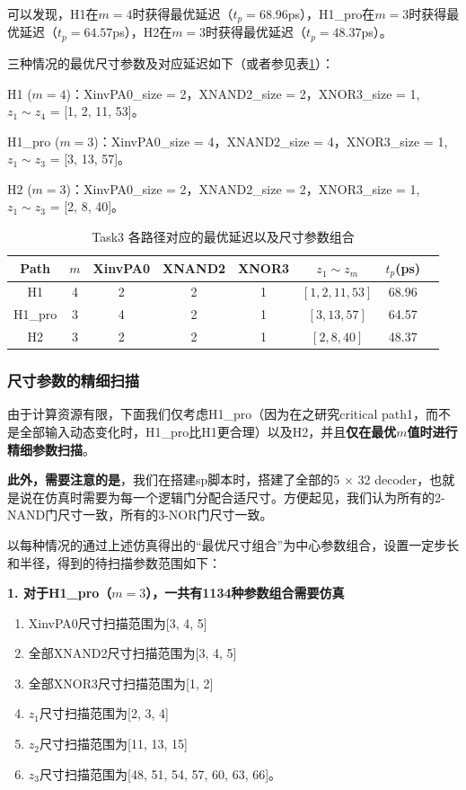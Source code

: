 \documentclass[UTF8,12pt,a4paper]{ctexart}
\begin{document}
可以发现，H1在$m=4$时获得最优延迟（$t_p = 68.96$ps），H1\_pro在$m = 3$时获得最优延迟（$t_p = 64.57$ps），H2在$m = 3$时获得最优延迟（$t_p = 48.37$ps）。

三种情况的最优尺寸参数及对应延迟如下（或者参见表\ref{tab:task3_parc_best_tp}）：

H1 ($m=4$)：XinvPA0\_size = 2，XNAND2\_size = 2，XNOR3\_size = 1, $z_1 \sim z_4$ = [1, 2, 11, 53]。

H1\_pro ($m=3$)：XinvPA0\_size = 4，XNAND2\_size = 4，XNOR3\_size = 1, $z_1 \sim z_3$ = [3, 13, 57]。

H2 ($m=3$)：XinvPA0\_size = 2，XNAND2\_size = 2，XNOR3\_size = 1, $z_1 \sim z_3$ = [2, 8, 40]。

\begin{table}[htbp]
    \centering
    \caption{Task3 各路径对应的最优延迟以及尺寸参数组合}
    \label{tab:task3_parc_best_tp}
    \small
    \begin{tabular}{cccccccc}
    \toprule
    Path & $m$ & XinvPA0 & XNAND2 & XNOR3 & $z_1 \sim z_m$ & $t_p$(ps) \\
    \midrule
    H1 & 4 & 2 & 2 & 1 & $[1, 2, 11, 53]$ & 68.96 \\
    H1\_pro & 3 & 4 & 2 & 1 & $[3, 13, 57]$ & 64.57 \\
    H2 & 3 & 2 & 2 & 1 & $[2, 8, 40]$ & 48.37 \\
    \bottomrule
    \end{tabular}
\end{table}

\subsubsection{尺寸参数的精细扫描}

由于计算资源有限，下面我们仅考虑H1\_pro（因为在之研究critical path1，而不是全部输入动态变化时，H1\_pro比H1更合理）以及H2，并且\textbf{仅在最优$m$值时进行精细参数扫描}。

\textbf{此外，需要注意的是}，我们在搭建sp脚本时，搭建了全部的5 $\times$ 32 decoder，也就是说在仿真时需要为每一个逻辑门分配合适尺寸。方便起见，我们认为所有的2-NAND门尺寸一致，所有的3-NOR门尺寸一致。

以每种情况的通过上述仿真得出的“最优尺寸组合”为中心参数组合，设置一定步长和半径，得到的待扫描参数范围如下：

\textbf{1. 对于H1\_pro（$m = 3$），一共有1134种参数组合需要仿真}
\begin{enumerate}
    \item XinvPA0尺寸扫描范围为[3, 4, 5]
    \item 全部XNAND2尺寸扫描范围为[3, 4, 5]
    \item 全部XNOR3尺寸扫描范围为[1, 2]
    \item $z_1$尺寸扫描范围为[2, 3, 4]
    \item $z_2$尺寸扫描范围为[11, 13, 15]
    \item $z_3$尺寸扫描范围为[48, 51, 54, 57, 60, 63, 66]。
\end{enumerate}
\end{document}
